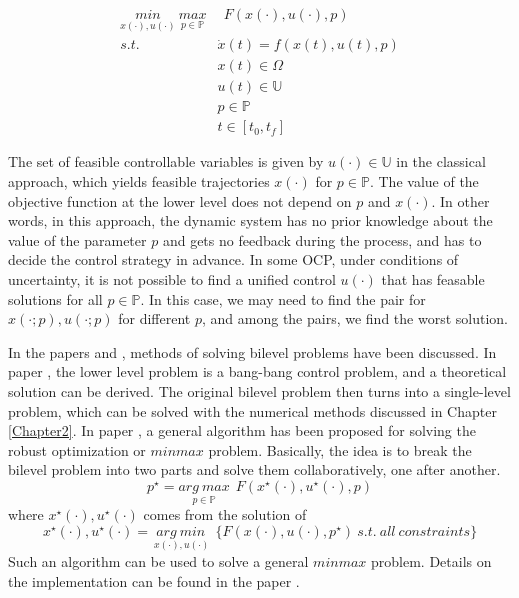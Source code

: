 \documentclass  [
  paper    = a4,
  BCOR     = 10mm,
  twoside,
  fontsize = 12pt,
  fleqn,
  toc      = bibnumbered,
  toc      = listofnumbered,
  numbers  = noendperiod,
  headings = normal,
  listof   = leveldown,
  version  = 3.03
]                                       {scrreprt}
\newcommand{\<}{\langle}
\renewcommand{\>}{\rangle}
\begin{document}
\begin{equation}
	\begin{aligned}
		\underset{x(\cdot), u(\cdot)}{min} \   \underset{p  \in   \mathbb{P} }{max} & \ \ F(x(\cdot), u(\cdot), p)\\ 
	s.t.\ \   &  \dot{x} (t) = f(x(t), u(t), p)\\ 
& x(t) \in \Omega \\
& u(t) \in \mathbb{U}  \\
& p  \in   \mathbb{P}  \\
& t \in [t_0, t_f]
	\end{aligned}
	\label{minmax}
\end{equation}

The set of feasible controllable variables is given by $u(\cdot) \in \mathbb{U}$ in the classical approach, which yields feasible trajectories $x(\cdot)$ for $p \in \mathbb{P}$. The value of the objective function at the lower level does not depend on $p$ and $x(\cdot)$. In other words, in this approach, the dynamic system has no prior knowledge about the value of the parameter $p$ and gets no feedback during the process, and has to decide the control strategy in advance. In some OCP, under conditions of uncertainty, it is not possible to find a unified control $u(\cdot)$ that has feasable solutions for all $p \in  \mathbb{P}$. In this case, we may need to find the pair for $x(\cdot;p), u(\cdot;p)$ for different $p$, and among the pairs, we find the worst solution.


In the papers \cite{Mas14} and \cite{KM16}, methods of solving bilevel problems have been discussed. In paper \cite{KM16}, the lower level problem is a bang-bang control problem, and a theoretical solution can be derived. The original bilevel problem then turns into a single-level problem, which can be solved with the numerical methods discussed in Chapter \ref{Chapter2}. In paper \cite{Mas14}, a general algorithm has been proposed for solving the robust optimization or $minmax$ problem. Basically, the idea is to break the bilevel problem into two parts and solve them collaboratively, one after another.
\begin{equation}
	   p^\star = \underset{p \in  \mathbb{P} }{arg\ max}   \ \ F(x^\star(\cdot), u^\star(\cdot), p)
\end{equation}
where $x^\star(\cdot), u^\star(\cdot)$ comes from the solution of 
\begin{equation}
	x^\star(\cdot), u^\star(\cdot) = \underset{\ x(\cdot), u(\cdot)}{arg\ min}   \ \ \{F(x(\cdot), u(\cdot), p^\star) \ s.t. \  all \ constraints \}
\end{equation}
Such an algorithm can be used to solve a general $minmax$ problem. Details on the implementation can be found in the paper \cite{Mas14}.
\end{document}
